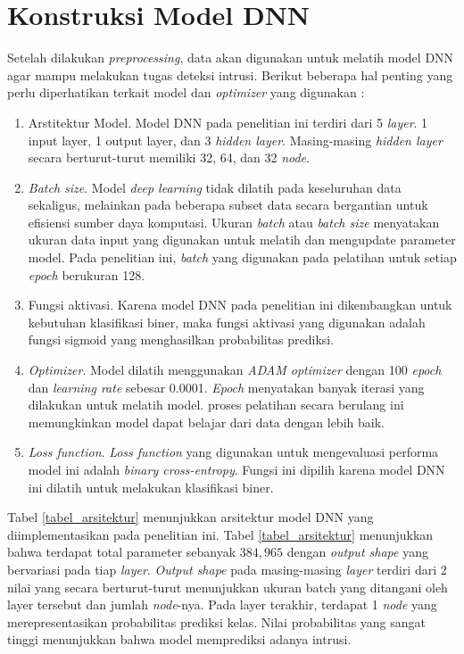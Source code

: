\documentclass[a4paper,12pt]{report}
\begin{document}
\section{Konstruksi Model DNN} 
Setelah dilakukan \textit{preprocessing}, data akan digunakan untuk melatih model DNN agar mampu melakukan tugas deteksi intrusi. Berikut beberapa hal penting yang perlu diperhatikan terkait model dan \textit{optimizer} yang digunakan :

\begin{enumerate}
	\item Arstitektur Model. Model DNN pada penelitian ini terdiri dari 5 \textit{layer}. 1 input layer, 1 output layer, dan 3 \textit{hidden layer}. Masing-masing \textit{hidden layer} secara berturut-turut memiliki 32, 64, dan 32 \textit{node}. 
	
	\item \textit{Batch size}. Model \textit{deep learning} tidak dilatih pada keseluruhan data sekaligus, melainkan pada beberapa subset data secara bergantian untuk efisiensi sumber daya komputasi. Ukuran \textit{batch} atau \textit{batch size} menyatakan ukuran data input yang digunakan untuk melatih dan mengupdate parameter model. Pada penelitian ini, \textit{batch} yang digunakan pada pelatihan untuk setiap \textit{epoch} berukuran 128.
	
	\item Fungsi aktivasi. Karena model DNN pada penelitian ini dikembangkan untuk kebutuhan klasifikasi biner, maka fungsi aktivasi yang digunakan adalah fungsi sigmoid yang menghasilkan probabilitas prediksi.
	
	\item \textit{Optimizer}. Model dilatih menggunakan \textit{ADAM optimizer} dengan 100 \textit{epoch} dan \textit{learning rate} sebesar 0.0001. \textit{Epoch} menyatakan banyak iterasi yang dilakukan untuk melatih model. proses pelatihan secara berulang ini memungkinkan model dapat belajar dari data dengan lebih baik.
	
	\item \textit{Loss function}. \textit{Loss function} yang digunakan untuk mengevaluasi performa model ini adalah \textit{binary cross-entropy}. Fungsi ini dipilih karena model DNN ini dilatih untuk melakukan klasifikasi biner.
\end{enumerate}

Tabel \ref{tabel_arsitektur} menunjukkan arsitektur model DNN yang diimplementasikan pada penelitian ini. Tabel \ref{tabel_arsitektur} menunjukkan bahwa terdapat total parameter sebanyak $384,965$ dengan \textit{output shape} yang bervariasi pada tiap \textit{layer}. \textit{Output shape} pada masing-masing \textit{layer} terdiri dari 2 nilai yang secara berturut-turut menunjukkan ukuran batch yang ditangani oleh layer tersebut dan jumlah \textit{node}-nya. Pada layer terakhir, terdapat 1 \textit{node} yang merepresentasikan probabilitas prediksi kelas. Nilai probabilitas yang sangat tinggi menunjukkan bahwa model memprediksi adanya intrusi.
\end{document}
